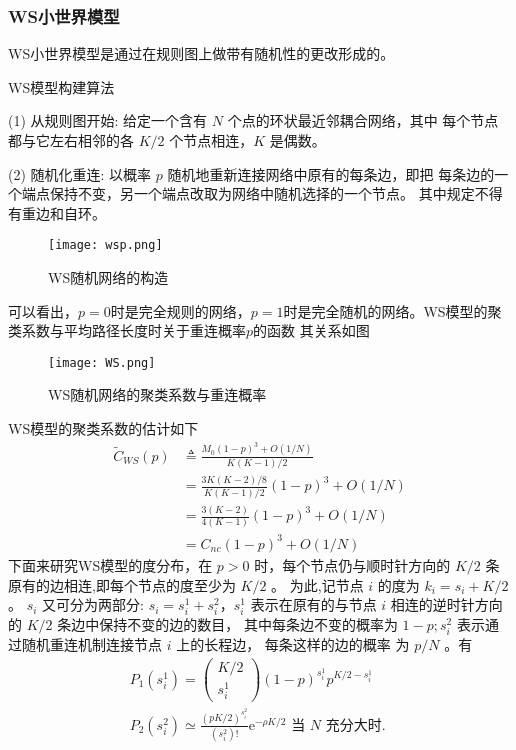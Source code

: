 \subsubsection*{WS小世界模型}
WS小世界模型是通过在规则图上做带有随机性的更改形成的。\par
\noindent WS模型构建算法\par
\noindent(1) 从规则图开始: 给定一个含有 $N$ 个点的环状最近邻耦合网络，其中 每个节点都与它左右相邻的各 $K / 2$ 个节点相连，$K$ 是偶数。\par
\noindent(2) 随机化重连: 以概率 $p$ 随机地重新连接网络中原有的每条边，即把 每条边的一个端点保持不变，另一个端点改取为网络中随机选择的一个节点。
其中规定不得有重边和自环。\par
\begin{figure}[!htbp]
    \centering
    \texttt{[image: wsp.png]}
    \caption{WS随机网络的构造}
\end{figure}
可以看出，$p=0$时是完全规则的网络，$p=1$时是完全随机的网络。WS模型的聚类系数与平均路径长度时关于重连概率$p$的函数
其关系如图
\begin{figure}[!htbp]
    \centering
    \texttt{[image: WS.png]}
    \caption{WS随机网络的聚类系数与重连概率}
\end{figure}
WS模型的聚类系数的估计如下
\begin{equation}
    \begin{aligned}
    \tilde{C}_{W S}(p) & \triangleq \frac{M_0(1-p)^3+O(1 / N)}{K(K-1) / 2} \\
    & =\frac{3 K(K-2) / 8}{K(K-1) / 2}(1-p)^3+O(1 / N) \\
    & =\frac{3(K-2)}{4(K-1)}(1-p)^3+O(1 / N) \\
    & =C_{n c}(1-p)^3+O(1 / N)
    \end{aligned}
\end{equation}
下面来研究WS模型的度分布，在 $p>0$ 时，每个节点仍与顺时针方向的 $K / 2$ 条原有的边相连,即每个节点的度至少为 $K / 2$ 。
 为此,记节点 $i$ 的度为 $k_i=s_i+K / 2$。 $s_i$ 又可分为两部分: 
 $s_i=s_i^1+s_i^2，s_i^1$ 表示在原有的与节点 $i$ 相连的逆时针方向的 $K / 2$ 条边中保持不变的边的数目，
 其中每条边不变的概率为 $1-p ; s_i^2$ 表示通过随机重连机制连接节点 $i$ 上的长程边，
 每条这样的边的概率 为 $p / N$ 。有
 \begin{equation}
    \begin{gathered}
    P_1\left(s_i^1\right)=\left(\begin{array}{c}
    K / 2 \\
    s_i^1
    \end{array}\right)(1-p)^{s_i^{1}} p^{K / 2-s_i^1}\\
    P_2\left(s_i^2\right) \simeq \frac{(p K / 2)^{s_i^2}}{\left(s_i^2\right) !} \mathrm{e}^{-\rho K / 2}\text { 当 } N \text { 充分大时. }
    \end{gathered}
\end{equation}
